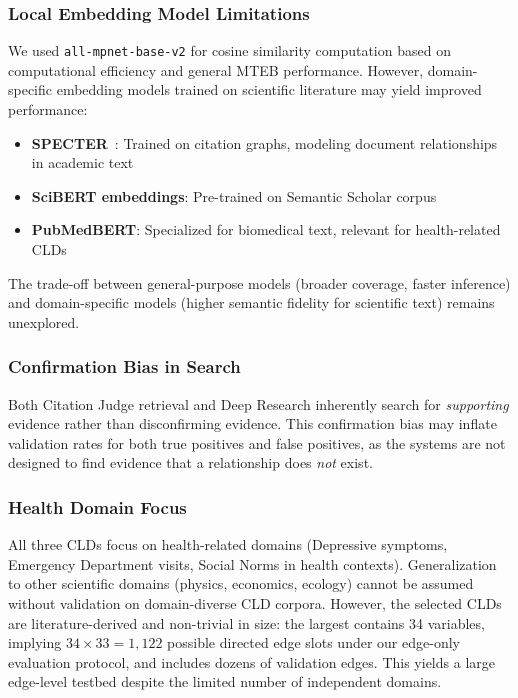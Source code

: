\subsubsection{Local Embedding Model Limitations}

We used \texttt{all-mpnet-base-v2} for cosine similarity computation based on computational efficiency and general MTEB performance. However, domain-specific embedding models trained on scientific literature may yield improved performance:
\begin{itemize}[noitemsep]
    \item \textbf{SPECTER}~\citep{cohan2020specter}: Trained on citation graphs, modeling document relationships in academic text
    \item \textbf{SciBERT embeddings}: Pre-trained on Semantic Scholar corpus
    \item \textbf{PubMedBERT}: Specialized for biomedical text, relevant for health-related CLDs
\end{itemize}

The trade-off between general-purpose models (broader coverage, faster inference) and domain-specific models (higher semantic fidelity for scientific text) remains unexplored.

\subsubsection{Confirmation Bias in Search}

Both Citation Judge retrieval and Deep Research inherently search for \textit{supporting} evidence rather than disconfirming evidence. This confirmation bias may inflate validation rates for both true positives and false positives, as the systems are not designed to find evidence that a relationship does \textit{not} exist.

\subsubsection{Health Domain Focus}

All three CLDs focus on health-related domains (Depressive symptoms, Emergency Department visits, Social Norms in health contexts). Generalization to other scientific domains (physics, economics, ecology) cannot be assumed without validation on domain-diverse CLD corpora. However, the selected CLDs are literature-derived and non-trivial in size: the largest contains 34 variables, implying $34 \times 33 = 1{,}122$ possible directed edge slots under our edge-only evaluation protocol, and includes dozens of validation edges. This yields a large edge-level testbed despite the limited number of independent domains.

